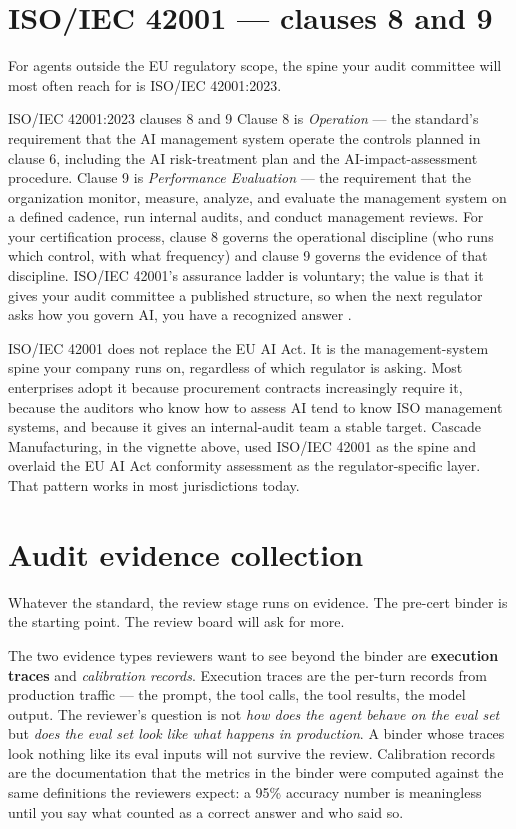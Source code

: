 \section{ISO/IEC 42001 --- clauses 8 and 9}

For agents outside the EU regulatory scope, the spine your audit committee will most often reach for is ISO/IEC 42001:2023.

\begin{TNinpractice}{ISO/IEC 42001:2023 clauses 8 and 9} Clause 8 is \textit{Operation} --- the standard's requirement that the AI management system operate the controls planned in clause 6, including the AI risk-treatment plan and the AI-impact-assessment procedure. Clause 9 is \textit{Performance Evaluation} --- the requirement that the organization monitor, measure, analyze, and evaluate the management system on a defined cadence, run internal audits, and conduct management reviews. For your certification process, clause 8 governs the operational discipline (who runs which control, with what frequency) and clause 9 governs the evidence of that discipline. ISO/IEC 42001's assurance ladder is voluntary; the value is that it gives your audit committee a published structure, so when the next regulator asks how you govern AI, you have a recognized answer \citep{iso-iec-42001}. \end{TNinpractice}

ISO/IEC 42001 does not replace the EU AI Act. It is the management-system spine your company runs on, regardless of which regulator is asking. Most enterprises adopt it because procurement contracts increasingly require it, because the auditors who know how to assess AI tend to know ISO management systems, and because it gives an internal-audit team a stable target. Cascade Manufacturing, in the vignette above, used ISO/IEC 42001 as the spine and overlaid the EU AI Act conformity assessment as the regulator-specific layer. That pattern works in most jurisdictions today.

\section{Audit evidence collection}

Whatever the standard, the review stage runs on evidence. The pre-cert binder is the starting point. The review board will ask for more.

The two evidence types reviewers want to see beyond the binder are \textbf{execution traces} and \textit{calibration records}. Execution traces are the per-turn records from production traffic --- the prompt, the tool calls, the tool results, the model output. The reviewer's question is not \textit{how does the agent behave on the eval set} but \textit{does the eval set look like what happens in production}. A binder whose traces look nothing like its eval inputs will not survive the review. Calibration records are the documentation that the metrics in the binder were computed against the same definitions the reviewers expect: a 95\% accuracy number is meaningless until you say what counted as a correct answer and who said so.

